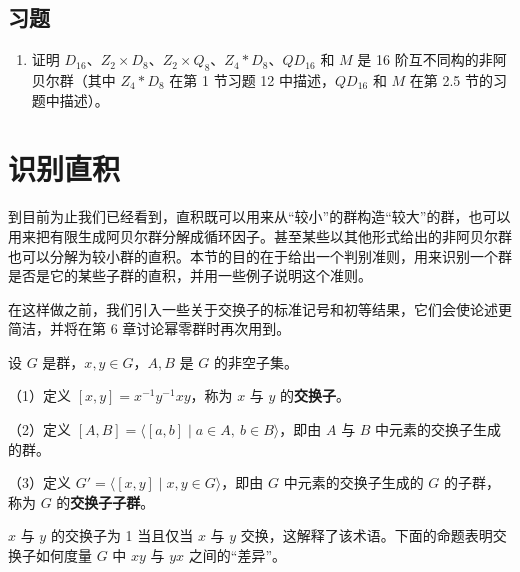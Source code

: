 \subsection*{习题}

\begin{enumerate}
\item 证明 \(D_{16}\)、\(Z_2 \times D_8\)、\(Z_2 \times Q_8\)、\(Z_4 * D_8\)、\(QD_{16}\) 和 \(M\) 是 16 阶互不同构的非阿贝尔群（其中 \(Z_4 * D_8\) 在第 1 节习题 12 中描述，\(QD_{16}\) 和 \(M\) 在第 2.5 节的习题中描述）。
\end{enumerate}

\section{识别直积}

到目前为止我们已经看到，直积既可以用来从“较小”的群构造“较大”的群，也可以用来把有限生成阿贝尔群分解成循环因子。甚至某些以其他形式给出的非阿贝尔群也可以分解为较小群的直积。本节的目的在于给出一个判别准则，用来识别一个群是否是它的某些子群的直积，并用一些例子说明这个准则。

在这样做之前，我们引入一些关于交换子的标准记号和初等结果，它们会使论述更简洁，并将在第 6 章讨论幂零群时再次用到。

\begin{definition}
设 \(G\) 是群，\(x, y \in G\)，\(A, B\) 是 \(G\) 的非空子集。

（1）定义 \([x, y] = x^{-1}y^{-1}xy\)，称为 \(x\) 与 \(y\) 的\textbf{交换子}。

（2）定义 \([A, B] = \langle [a, b] \mid a \in A,\ b \in B \rangle\)，即由 \(A\) 与 \(B\) 中元素的交换子生成的群。

（3）定义 \(G' = \langle [x, y] \mid x, y \in G \rangle\)，即由 \(G\) 中元素的交换子生成的 \(G\) 的子群，称为 \(G\) 的\textbf{交换子子群}。
\end{definition}

\(x\) 与 \(y\) 的交换子为 1 当且仅当 \(x\) 与 \(y\) 交换，这解释了该术语。下面的命题表明交换子如何度量 \(G\) 中 \(xy\) 与 \(yx\) 之间的“差异”。

